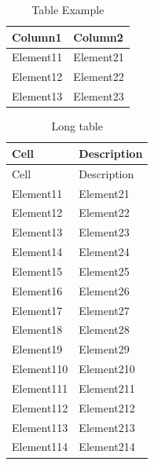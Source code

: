 

\begin{table}[H]
    \centering
    \begin{tabular}{|m{5cm}|m{10cm}|}
        \hline
          Column1 & Column2 \\
        \hline
          Element11 & Element21 \\
        \hline
          Element12 & Element22 \\
        \hline
          Element13 & Element23 \\
        \hline
    \end{tabular}
    \caption{Table Example}
\end{table}



\begin{longtable}[c]{| m{4.4cm} | m{11cm} |}
\caption{Long table}\\
 \hline

 Cell & Description  \\ 
 \hline
 \endfirsthead

 \hline
 
 Cell & Description  \\ 
 \hline
 \endhead

        \hline
          Element11 & Element21 \\
        \hline
          Element12 & Element22 \\
        \hline
          Element13 & Element23 \\
        \hline
          Element14 & Element24 \\
        \hline
          Element15 & Element25 \\
        \hline
          Element16 & Element26 \\
        \hline
          Element17 & Element27 \\
        \hline
          Element18 & Element28 \\
        \hline
          Element19 & Element29 \\
        \hline
          Element110 & Element210 \\
        \hline
          Element111 & Element211 \\
        \hline
          Element112 & Element212 \\
        \hline
          Element113 & Element213 \\
        \hline
          Element114 & Element214 \\
        \hline

 \end{longtable}

